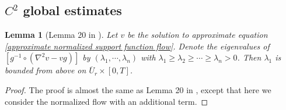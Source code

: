 \documentclass[reqno]{amsart}
\newtheorem{lemma}[theorem]{Lemma}
\theoremstyle{remark}
\theoremstyle{definition}
\numberwithin{equation}{section}
\begin{document}
\subsection{\texorpdfstring{$C^2$}{C2} global estimates}

\begin{lemma}[Lemma 20 in \cite{Entireconvexcurvatureflow}]
    Let $v$ be the solution to approximate equation \eqref{approximate normalized support function flow}. Denote the eigenvalues of $\left[ g^{-1} \circ \left( \nabla^2 v - vg \right) \right]$ by $(\lambda_1, \cdots, \lambda_n)$ with $\lambda_1 \geqslant \lambda_2 \geqslant \cdots \geqslant \lambda_n > 0$. Then $\lambda_1$ is bounded from above on $\overline{U}_r \times [0, T]$. 
\end{lemma}
\begin{proof}
    The proof is almost the same as Lemma 20 in \cite{Entireconvexcurvatureflow}, except that here we consider the normalized flow with an additional term.
\end{proof}
\end{document}
